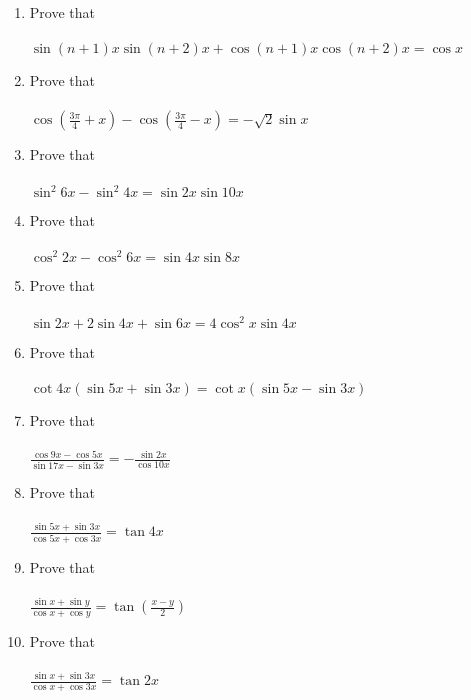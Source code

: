 \begin{enumerate}[label=\arabic*]
\item Prove that\\
\\$\sin(n+1)x\sin(n+2)x+\cos(n+1)x\cos(n+2)x=\cos x$\\

\item Prove that\\
\\$\cos(\frac{3\pi}{4}+x)-\cos(\frac{3\pi}{4}-x)=-\sqrt 2\sin x $\\

\item Prove that\\
\\$\sin^{2}6x-\sin^{2}4x=\sin2x\sin10x$\\

\item Prove that\\
\\$\cos^{2}2x-\cos^{2}6x=\sin4x\sin8x$\\

\item Prove that\\
\\$\sin2x+2\sin4x+\sin6x=4\cos^{2}x\sin4x$\\

\item Prove that\\
\\$\cot4x(\sin5x+\sin3x)= \cot x(\sin5x-\sin3x)$\\

\item Prove that\\
\\$\frac{\cos9x-\cos5x}{\sin17x-\sin3x}=-\frac{\sin2x}{\cos10x}$\\

\item Prove that\\
\\$\frac{\sin5x+\sin3x}{\cos5x+\cos3x}=\tan4x$\\

\item Prove that\\
\\$\frac{\sin x+\sin y}{\cos x+\cos y}=\tan(\frac{x-y}{2})$\\

\item Prove that\\
\\$\frac{\sin x+\sin3x}{\cos x+\cos3x}=\tan2x$\\


\end{enumerate}
